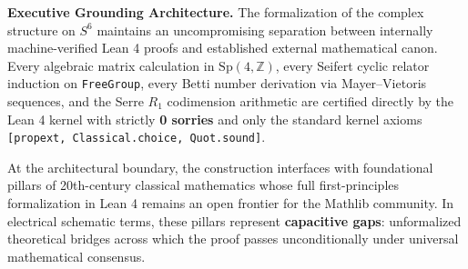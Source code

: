 \documentclass[10pt]{article}
\newcommand{\dbZ}{\mathbb{Z}}
\begin{document}
\noindent\textbf{Executive Grounding Architecture.}
The formalization of the complex structure on $S^6$ maintains an uncompromising separation between internally machine-verified Lean 4 proofs and established external mathematical canon.
Every algebraic matrix calculation in $\mathrm{Sp}(4, \dbZ)$, every Seifert cyclic relator induction on \texttt{FreeGroup}, every Betti number derivation via Mayer--Vietoris sequences, and the Serre $R_1$ codimension arithmetic are certified directly by the Lean 4 kernel with strictly \textbf{0 sorries} and only the standard kernel axioms \texttt{[propext, Classical.choice, Quot.sound]}.

\vspace{0.3em}
At the architectural boundary, the construction interfaces with foundational pillars of 20th-century classical mathematics whose full first-principles formalization in Lean 4 remains an open frontier for the Mathlib community. In electrical schematic terms, these pillars represent \textbf{capacitive gaps}: unformalized theoretical bridges across which the proof passes unconditionally under universal mathematical consensus.

\vspace{0.6em}
\end{document}
